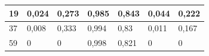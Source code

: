\documentclass{classrep}
\begin{document}
{\begin{table}[H]
\begin{center}
\begin{tabular}{|l|l|l|l|l|l|l|}
19                                                                 & 0,024                                                                  & 0,273                                                                     & 0,985                                                         & 0,843                                                            & 0,044                                                            & 0,222                                                                \\ \hline
37                                                                 & 0,008                                                                  & 0,333                                                                     & 0,994                                                         & 0,83                                                             & 0,011                                                            & 0,167                                                                \\ \hline
59                                                                 & 0                                                                      & 0                                                                         & 0,998                                                         & 0,821                                                            & 0                                                                & 0                                                                    \\ \hline
\end{tabular}
\end{center}
\end{table}

}
\end{document}
